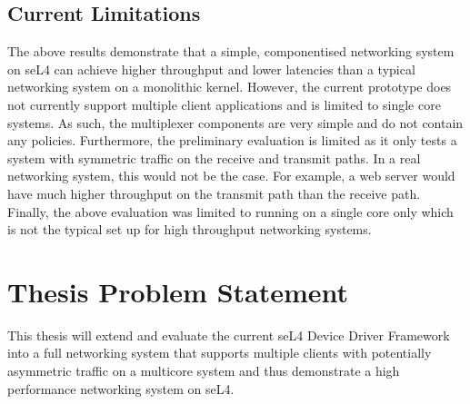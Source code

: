 \subsection{Current Limitations}
The above results demonstrate that a simple, componentised networking system on seL4 can achieve higher throughput and lower latencies than a typical
networking system on a monolithic kernel. However, the current prototype does not currently support multiple client applications and 
is limited to single core systems. As such, the multiplexer components are very simple and do not contain any policies. Furthermore, the 
preliminary evaluation is limited as it only tests a system with symmetric traffic on the receive and transmit paths. In a real
networking system, this would not be the case. For example, a web server would have much higher throughput on the transmit path than the receive path.
Finally, the above evaluation was limited to running on a single core only which is not the typical set up for high throughput networking systems.

\section{Thesis Problem Statement}
This thesis will extend and evaluate the current seL4 Device Driver Framework 
into a full networking system that supports multiple clients with potentially asymmetric traffic 
on a multicore system and thus demonstrate a high performance networking system on seL4.
